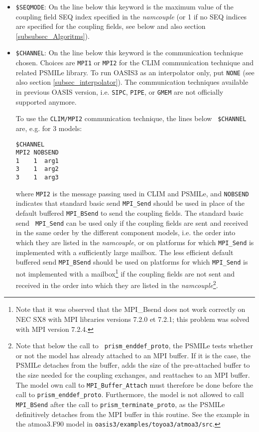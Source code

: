 \begin{itemize}

\item {\tt \$SEQMODE}: On the line below this keyword is the maximum value of the coupling field SEQ index
specified in the {\it namcouple}
(or 1 if no SEQ indices are specified for the coupling fields, see below and also section
  \ref{subsubsec_Algoritms}).

\item {\tt \$CHANNEL}: On the line below this keyword is the
communication technique chosen. Choices are {\tt MPI1} or {\tt MPI2}
for the CLIM communication technique and related PSMILe library.  
To run OASIS3 as an
interpolator only, put {\tt NONE} (see also section
\ref{subsec_interpolator}). 
The communication techniques available in previous OASIS version, i.e.
{\tt SIPC}, {\tt PIPE}, or {\tt GMEM} are not
officially supported anymore.

To use the {\tt CLIM/MPI2} communication technique, the lines below {\tt
  \$CHANNEL} are, e.g. for 3 models:
\begin{verbatim} 
$CHANNEL 
MPI2 NOBSEND
1    1  arg1 
3    1  arg2
3    1  arg3 
\end{verbatim}
where {\tt MPI2} is the message passing used in CLIM and PSMILe, and
{\tt NOBSEND} indicates that standard basic send {\tt MPI\_Send}
should be used in place of the default buffered {\tt MPI\_BSend} to send the
coupling fields. The standard basic send {\tt
  MPI\_Send} can be used only if the coupling fields are sent and received in the same order
by the different component models, i.e. the order into which they are listed in the {\it namcouple}, or on platforms for which {\tt MPI\_Send} is
implemented with a sufficiently large mailbox. The less efficient default
buffered send {\tt MPI\_BSend} should be used on platforms for which {\tt MPI\_Send}
is not implemented with a mailbox\footnote{Note that it was
observed that the MPI\_Bsend does not work correctly on NEC SX8 with
MPI libraries versions 7.2.0 et 7.2.1; this problem was solved with
MPI version 7.2.4.} if the coupling fields are not sent
and received in the order into which they are listed in the {\it namcouple}\footnote{Note that below the call to {\tt
  prism\_enddef\_proto}, the PSMILe tests whether or not the model has
already attached to an MPI buffer. If it is the case, the PSMILe
detaches from the buffer, adds the size of the pre-attached buffer to
the size needed for the coupling exchanges, and reattaches to an MPI
buffer. The model own call to {\tt MPI\_Buffer\_Attach} must therefore
be done before the call to {\tt prism\_enddef\_proto}. Furthermore,
the model is not allowed to call {\tt MPI\_BSend} after the call to
{\tt prism\_terminate\_proto}, as the PSMILe definitively detaches
from the MPI buffer in this routine. See the example in the atmoa3.F90
model in {\tt oasis3/examples/toyoa3/atmoa3/src}.}. 


\end{itemize}
